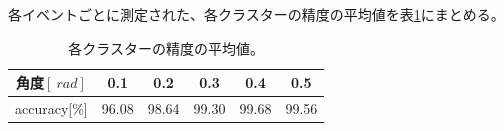 各イベントごとに測定された、各クラスターの精度の平均値を表\ref{acc_Grav}にまとめる。

\begin{table}[h]
	\begin{center}
		\begin{tabular}{|c|c|c|c|c|c|}
		\hline
		角度$[\SI{}{rad}]$&0.1&0.2&0.3&0.4&0.5\\\hline\hline
		accuracy[\%]&96.08&98.64&99.30&99.68&99.56\\\hline
		\end{tabular}
	\end{center}
	\caption[各クラスターの精度の平均値]{各クラスターの精度の平均値。}
\label{acc_Grav}
\end{table}


